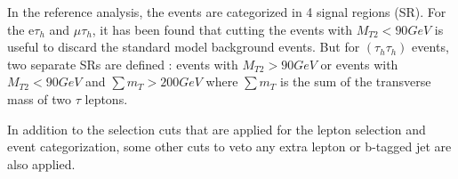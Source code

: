 In the reference analysis, the events are categorized in 4 signal regions (SR). For the e$\tau_h$ and $\mu\tau_h$, it has been found that cutting the events with $M_{T2}<90 GeV$ is useful to discard the standard model background events. But for $(\tau_h \tau_h)$ events, two separate SRs are defined : events with $M_{T2}>90 GeV$ or events with $M_{T2}<90 GeV$ and $\sum m_{T} > 200 GeV$ where $\sum m_{T}$ is the sum of the transverse mass of two $\tau$ leptons.

In addition to the selection cuts that are applied for the lepton selection and event categorization, some other cuts to veto any extra lepton or b-tagged jet  are also applied. 



 
 

